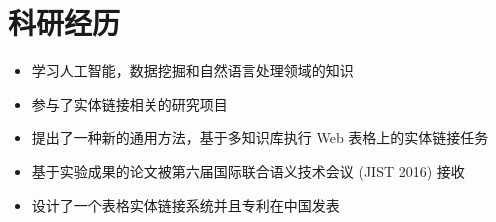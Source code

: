 \section{科研经历}
\begin{itemize}
  \item 学习人工智能，数据挖掘和自然语言处理领域的知识
  \item 参与了实体链接相关的研究项目
\end{itemize}

\begin{itemize}
  \item 提出了一种新的通用方法，基于多知识库执行 Web 表格上的实体链接任务
  \item 基于实验成果的论文被第六届国际联合语义技术会议 (JIST 2016) 接收
  \item 设计了一个表格实体链接系统并且专利在中国发表
\end{itemize}